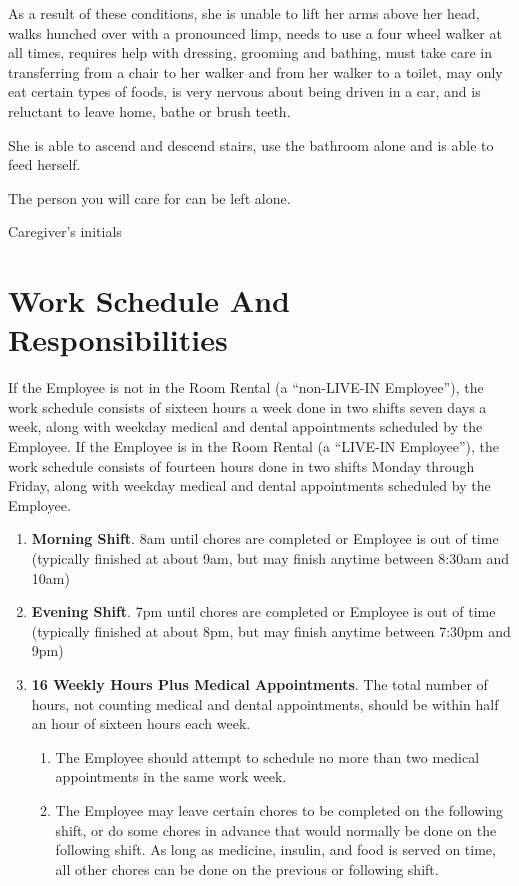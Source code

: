 \documentclass[]{article}
\newcommand{\initialfillin}{\hspace{0.2cm}\makebox[1.5cm]{\hrulefill}}
\begin{document}
As a result of these conditions, she is unable to lift her arms above her head, walks hunched over with a pronounced limp, needs to use a four wheel walker at all times, requires help with dressing, grooming and bathing, must take care in transferring from a chair to her walker and from her walker to a toilet, may only eat certain types of foods, is very nervous about being driven in a car, and is reluctant to leave home, bathe or brush teeth.

She is able to ascend and descend stairs, use the bathroom alone and is able to feed herself.

The person you will care for can be left alone.

Caregiver's initials \initialfillin{}

\section{Work Schedule And Responsibilities}

If the Employee is not in the Room Rental (a ``non-LIVE-IN Employee''), the work schedule consists of sixteen hours a week done in two shifts seven days a week, along with weekday medical and dental appointments scheduled by the Employee. If the Employee is in the Room Rental (a ``LIVE-IN Employee''), the work schedule consists of fourteen hours done in two shifts Monday through Friday, along with weekday medical and dental appointments scheduled by the Employee. 
\begin{enumerate}
	\item \textbf{Morning Shift}. 8am until chores are completed or Employee is out of time (typically finished at about 9am, but may finish anytime between 8:30am and 10am)
	\item \textbf{Evening Shift}. 7pm until chores are completed or Employee is out of time (typically finished at about 8pm, but may finish anytime between 7:30pm and 9pm)
	\item \textbf{16 Weekly Hours Plus Medical Appointments}. The total number of hours, not counting medical and dental appointments, should be within half an hour of sixteen hours each week. 
		\begin{enumerate}
			\item The Employee should attempt to schedule no more than two medical appointments in the same work week.
			\item The Employee may leave certain chores to be completed on the following shift, or do some chores in advance that would normally be done on the following shift. As long as medicine, insulin, and food is served on time, all other chores can be done on the previous or following shift.
		\end{enumerate}
\end{enumerate}
\end{document}
